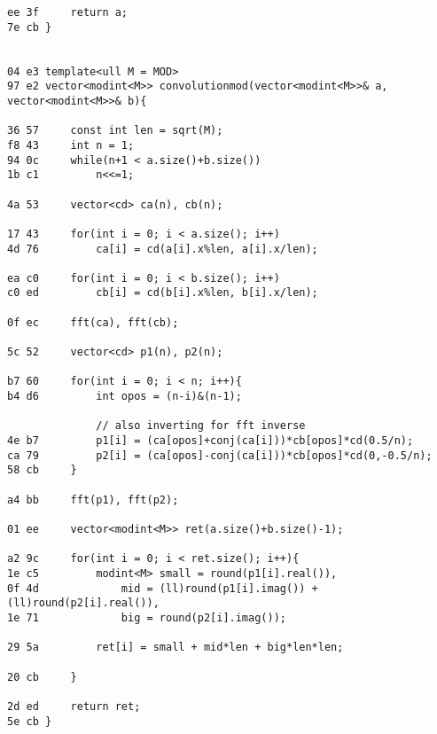 \documentclass[11pt, a4paper, twoside]{article}
\begin{document}
\begin{lstlisting}
ee 3f     return a;
7e cb }
 

04 e3 template<ull M = MOD>
97 e2 vector<modint<M>> convolutionmod(vector<modint<M>>& a, vector<modint<M>>& b){
          
36 57     const int len = sqrt(M);
f8 43     int n = 1;
94 0c     while(n+1 < a.size()+b.size())
1b c1         n<<=1;
      
4a 53     vector<cd> ca(n), cb(n);
      
17 43     for(int i = 0; i < a.size(); i++)
4d 76         ca[i] = cd(a[i].x%len, a[i].x/len);
          
ea c0     for(int i = 0; i < b.size(); i++)
c0 ed         cb[i] = cd(b[i].x%len, b[i].x/len);
      
0f ec     fft(ca), fft(cb);
      
5c 52     vector<cd> p1(n), p2(n);
      
b7 60     for(int i = 0; i < n; i++){
b4 d6         int opos = (n-i)&(n-1);
      
              // also inverting for fft inverse
4e b7         p1[i] = (ca[opos]+conj(ca[i]))*cb[opos]*cd(0.5/n);
ca 79         p2[i] = (ca[opos]-conj(ca[i]))*cb[opos]*cd(0,-0.5/n);
58 cb     }
      
a4 bb     fft(p1), fft(p2);
      
01 ee     vector<modint<M>> ret(a.size()+b.size()-1);
      
a2 9c     for(int i = 0; i < ret.size(); i++){
1e c5         modint<M> small = round(p1[i].real()),
0f 4d             mid = (ll)round(p1[i].imag()) + (ll)round(p2[i].real()),
1e 71             big = round(p2[i].imag());
      
29 5a         ret[i] = small + mid*len + big*len*len;
      
20 cb     }
      
2d ed     return ret;
5e cb }
\end{lstlisting}
\end{document}
